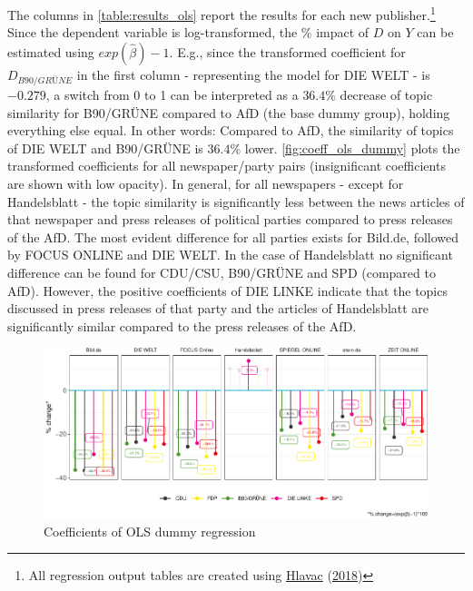 \documentclass[
]{article}
\begin{document}
The columns in \autoref{table:results_ols} report the results for each
new publisher.\footnote{All regression output tables are created using
  \protect\hyperlink{ref-hlavac_stargazer_2018}{Hlavac}
  (\protect\hyperlink{ref-hlavac_stargazer_2018}{2018})} Since the
dependent variable is log-transformed, the \(\%\) impact of \(D\) on
\(Y\) can be estimated using \(exp(\hat\beta)-1\). E.g., since the
transformed coefficient for \(D_{B90/GRÜNE}\) in the first column -
representing the model for DIE WELT - is \(-0.279\), a switch from 0 to
1 can be interpreted as a \(36.4\%\) decrease of topic similarity for
B90/GRÜNE compared to AfD (the base dummy group), holding everything
else equal. In other words: Compared to AfD, the similarity of topics of
DIE WELT and B90/GRÜNE is \(36.4\%\) lower.
\autoref{fig:coeff_ols_dummy} plots the transformed coefficients for all
newspaper/party pairs (insignificant coefficients are shown with low
opacity). In general, for all newspapers - except for Handelsblatt - the
topic similarity is significantly less between the news articles of that
newspaper and press releases of political parties compared to press
releases of the AfD. The most evident difference for all parties exists
for Bild.de, followed by FOCUS ONLINE and DIE WELT. In the case of
Handelsblatt no significant difference can be found for CDU/CSU,
B90/GRÜNE and SPD (compared to AfD). However, the positive coefficients
of DIE LINKE indicate that the topics discussed in press releases of
that party and the articles of Handelsblatt are significantly similar
compared to the press releases of the AfD.

\begin{figure}

{\centering \includegraphics[width=1\linewidth]{main_text_files/figure-latex/Plot coefficients - simple dummy-1} 

}

\caption{Coefficients of OLS dummy regression \label{fig:coeff_ols_dummy}}\label{fig:Plot coefficients - simple dummy}
\end{figure}
\end{document}
